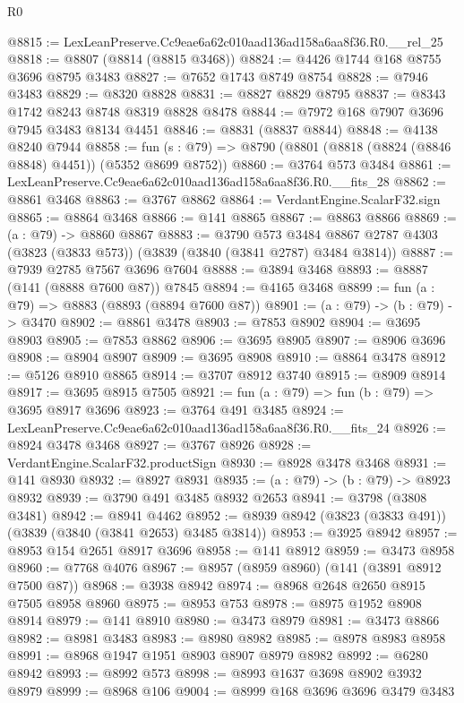 \begin{lexlean}{R0}
\begin{coremodule}
@8815 := LexLeanPreserve.Cc9eae6a62c010aad136ad158a6aa8f36.R0.__rel_25
@8818 := @8807 (@8814 (@8815 @3468))
@8824 := @4426 @1744 @168 @8755 @3696 @8795 @3483
@8827 := @7652 @1743 @8749 @8754
@8828 := @7946 @3483
@8829 := @8320 @8828
@8831 := @8827 @8829 @8795
@8837 := @8343 @1742 @8243 @8748 @8319 @8828 @8478
@8844 := @7972 @168 @7907 @3696 @7945 @3483 @8134 @4451
@8846 := @8831 (@8837 @8844)
@8848 := @4138 @8240 @7944
@8858 := fun (s : @79) => @8790 (@8801 (@8818 (@8824 (@8846 @8848) @4451)) (@5352 @8699 @8752))
@8860 := @3764 @573 @3484
@8861 := LexLeanPreserve.Cc9eae6a62c010aad136ad158a6aa8f36.R0.__fits_28
@8862 := @8861 @3468
@8863 := @3767 @8862
@8864 := VerdantEngine.ScalarF32.sign
@8865 := @8864 @3468
@8866 := @141 @8865
@8867 := @8863 @8866
@8869 := (a : @79) -> @8860 @8867
@8883 := @3790
    @573
    @3484
    @8867
    @2787
    @4303
    (@3823 (@3833 @573))
    (@3839 (@3840 (@3841 @2787) @3484 @3814))
@8887 := @7939 @2785 @7567 @3696 @7604
@8888 := @3894 @3468
@8893 := @8887 (@141 (@8888 @7600 @87)) @7845
@8894 := @4165 @3468
@8899 := fun (a : @79) => @8883 (@8893 (@8894 @7600 @87))
@8901 := (a : @79) -> (b : @79) -> @3470
@8902 := @8861 @3478
@8903 := @7853 @8902
@8904 := @3695 @8903
@8905 := @7853 @8862
@8906 := @3695 @8905
@8907 := @8906 @3696
@8908 := @8904 @8907
@8909 := @3695 @8908
@8910 := @8864 @3478
@8912 := @5126 @8910 @8865
@8914 := @3707 @8912 @3740
@8915 := @8909 @8914
@8917 := @3695 @8915 @7505
@8921 := fun (a : @79) => fun (b : @79) => @3695 @8917 @3696
@8923 := @3764 @491 @3485
@8924 := LexLeanPreserve.Cc9eae6a62c010aad136ad158a6aa8f36.R0.__fits_24
@8926 := @8924 @3478 @3468
@8927 := @3767 @8926
@8928 := VerdantEngine.ScalarF32.productSign
@8930 := @8928 @3478 @3468
@8931 := @141 @8930
@8932 := @8927 @8931
@8935 := (a : @79) -> (b : @79) -> @8923 @8932
@8939 := @3790 @491 @3485 @8932 @2653
@8941 := @3798 (@3808 @3481)
@8942 := @8941 @4462
@8952 := @8939 @8942 (@3823 (@3833 @491)) (@3839 (@3840 (@3841 @2653) @3485 @3814))
@8953 := @3925 @8942
@8957 := @8953 @154 @2651 @8917 @3696
@8958 := @141 @8912
@8959 := @3473 @8958
@8960 := @7768 @4076
@8967 := @8957 (@8959 @8960) (@141 (@3891 @8912 @7500 @87))
@8968 := @3938 @8942
@8974 := @8968 @2648 @2650 @8915 @7505 @8958 @8960
@8975 := @8953 @753
@8978 := @8975 @1952 @8908 @8914
@8979 := @141 @8910
@8980 := @3473 @8979
@8981 := @3473 @8866
@8982 := @8981 @3483
@8983 := @8980 @8982
@8985 := @8978 @8983 @8958
@8991 := @8968 @1947 @1951 @8903 @8907 @8979 @8982
@8992 := @6280 @8942
@8993 := @8992 @573
@8998 := @8993 @1637 @3698 @8902 @3932 @8979
@8999 := @8968 @106
@9004 := @8999 @168 @3696 @3696 @3479 @3483

\end{coremodule}
\end{lexlean}
